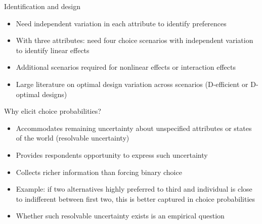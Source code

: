 \documentclass[aspectratio=169]{beamer}
\begin{document}
\begin{frame}

Identification and design

\bigskip

\begin{itemize}
\itemsep1.5em
\item<2-> Need independent variation in each attribute to identify preferences
\item<3-> With three attributes: need four choice scenarios with independent variation to identify linear effects
\item<4-> Additional scenarios required for nonlinear effects or interaction effects
\item<5-> Large literature on optimal design variation across scenarios (D-efficient or D-optimal designs)
\end{itemize}

\end{frame}

\begin{frame}

Why elicit choice probabilities?

\bigskip

\begin{itemize}
\itemsep1.5em
\item<2-> Accommodates remaining uncertainty about unspecified attributes or states of the world (resolvable uncertainty)
\item<3-> Provides respondents opportunity to express such uncertainty
\item<4-> Collects richer information than forcing binary choice
\item<5-> Example: if two alternatives highly preferred to third and individual is close to indifferent between first two, this is better captured in choice probabilities
\item<6-> Whether such resolvable uncertainty exists is an empirical question
\end{itemize}

\end{frame}
\end{document}
